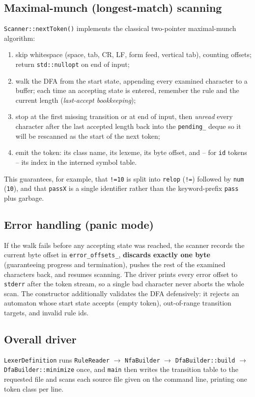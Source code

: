 \documentclass[11pt,a4paper]{article}
\begin{document}
\subsection{Maximal-munch (longest-match) scanning}
\texttt{Scanner::nextToken()} implements the classical two-pointer maximal-munch
algorithm:
\begin{enumerate}
    \item skip whitespace (space, tab, CR, LF, form feed, vertical tab), counting
          offsets; return \texttt{std::nullopt} on end of input;
    \item walk the DFA from the start state, appending every examined character
          to a buffer; each time an accepting state is entered, remember the rule
          and the current length (\emph{last-accept bookkeeping});
    \item stop at the first missing transition or at end of input, then
          \emph{unread} every character after the last accepted length back into
          the \texttt{pending\_} deque so it will be rescanned as the start of
          the next token;
    \item emit the token: its class name, its lexeme, its byte offset, and -- for
          \texttt{id} tokens -- its index in the interned symbol table.
\end{enumerate}
This guarantees, for example, that \texttt{!=10} is split into \texttt{relop}
(\texttt{!=}) followed by \texttt{num} (\texttt{10}), and that
\texttt{passX} is a single identifier rather than the keyword-prefix
\texttt{pass} plus garbage.

\subsection{Error handling (panic mode)}
If the walk fails before any accepting state was reached, the scanner records
the current byte offset in \texttt{error\_offsets\_}, \textbf{discards exactly one
byte} (guaranteeing progress and termination), pushes the rest of the examined
characters back, and resumes scanning. The driver prints every error offset to
\texttt{stderr} after the token stream, so a single bad character never aborts
the whole scan. The constructor additionally validates the DFA defensively: it
rejects an automaton whose start state accepts (empty token), out-of-range
transition targets, and invalid rule ids.

\subsection{Overall driver}
\texttt{LexerDefinition} runs
\texttt{RuleReader} $\rightarrow$ \texttt{NfaBuilder} $\rightarrow$
\texttt{DfaBuilder::build} $\rightarrow$ \texttt{DfaBuilder::minimize} once, and
\texttt{main} then writes the transition table to the requested file and scans
each source file given on the command line, printing one token class per line.
\end{document}
